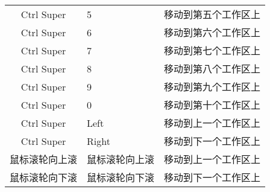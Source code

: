 \documentclass[11pt]{article}
\begin{document}
\begin{left}
\begin{tabular}{|c|l|l|}
    Ctrl Super & 5 & 移动到第五个工作区上 \\
    Ctrl Super & 6 & 移动到第六个工作区上 \\
    Ctrl Super & 7 & 移动到第七个工作区上 \\
    Ctrl Super & 8 & 移动到第八个工作区上 \\
    Ctrl Super & 9 & 移动到第九个工作区上 \\
    Ctrl Super & 0 & 移动到第十个工作区上 \\
    Ctrl Super & Left & 移动到上一个工作区上 \\
    Ctrl Super & Right & 移动到下一个工作区上 \\
    鼠标滚轮向上滚 & 鼠标滚轮向上滚 & 移动到上一个工作区上 \\
    鼠标滚轮向下滚 & 鼠标滚轮向下滚 & 移动到下一个工作区上 \\
    \hline
  \end{tabular}  
\end{left}
\end{document}
